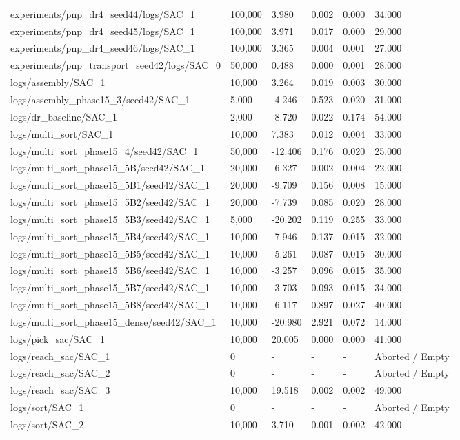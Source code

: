 \documentclass[11pt,a4paper,oneside]{book}
\begin{document}
\begin{longtable}{l l l l l l}
experiments/pnp\_dr4\_seed44/logs/SAC\_1 & 100,000 & 3.980 & 0.002 & 0.000 & 34.000 \\
experiments/pnp\_dr4\_seed45/logs/SAC\_1 & 100,000 & 3.971 & 0.017 & 0.000 & 29.000 \\
experiments/pnp\_dr4\_seed46/logs/SAC\_1 & 100,000 & 3.365 & 0.004 & 0.001 & 27.000 \\
experiments/pnp\_transport\_seed42/logs/SAC\_0 & 50,000 & 0.488 & 0.000 & 0.001 & 28.000 \\
logs/assembly/SAC\_1 & 10,000 & 3.264 & 0.019 & 0.003 & 30.000 \\
logs/assembly\_phase15\_3/seed42/SAC\_1 & 5,000 & -4.246 & 0.523 & 0.020 & 31.000 \\
logs/dr\_baseline/SAC\_1 & 2,000 & -8.720 & 0.022 & 0.174 & 54.000 \\
logs/multi\_sort/SAC\_1 & 10,000 & 7.383 & 0.012 & 0.004 & 33.000 \\
logs/multi\_sort\_phase15\_4/seed42/SAC\_1 & 50,000 & -12.406 & 0.176 & 0.020 & 25.000 \\
logs/multi\_sort\_phase15\_5B/seed42/SAC\_1 & 20,000 & -6.327 & 0.002 & 0.004 & 22.000 \\
logs/multi\_sort\_phase15\_5B1/seed42/SAC\_1 & 20,000 & -9.709 & 0.156 & 0.008 & 15.000 \\
logs/multi\_sort\_phase15\_5B2/seed42/SAC\_1 & 20,000 & -7.739 & 0.085 & 0.020 & 28.000 \\
logs/multi\_sort\_phase15\_5B3/seed42/SAC\_1 & 5,000 & -20.202 & 0.119 & 0.255 & 33.000 \\
logs/multi\_sort\_phase15\_5B4/seed42/SAC\_1 & 10,000 & -7.946 & 0.137 & 0.015 & 32.000 \\
logs/multi\_sort\_phase15\_5B5/seed42/SAC\_1 & 10,000 & -5.261 & 0.087 & 0.015 & 30.000 \\
logs/multi\_sort\_phase15\_5B6/seed42/SAC\_1 & 10,000 & -3.257 & 0.096 & 0.015 & 35.000 \\
logs/multi\_sort\_phase15\_5B7/seed42/SAC\_1 & 10,000 & -3.703 & 0.093 & 0.015 & 34.000 \\
logs/multi\_sort\_phase15\_5B8/seed42/SAC\_1 & 10,000 & -6.117 & 0.897 & 0.027 & 40.000 \\
logs/multi\_sort\_phase15\_dense/seed42/SAC\_1 & 10,000 & -20.980 & 2.921 & 0.072 & 14.000 \\
logs/pick\_sac/SAC\_1 & 10,000 & 20.005 & 0.000 & 0.000 & 41.000 \\
logs/reach\_sac/SAC\_1 & 0 & - & - & - & Aborted / Empty \\
logs/reach\_sac/SAC\_2 & 0 & - & - & - & Aborted / Empty \\
logs/reach\_sac/SAC\_3 & 10,000 & 19.518 & 0.002 & 0.002 & 49.000 \\
logs/sort/SAC\_1 & 0 & - & - & - & Aborted / Empty \\
logs/sort/SAC\_2 & 10,000 & 3.710 & 0.001 & 0.002 & 42.000 \\
\bottomrule \end{longtable}
\end{document}
